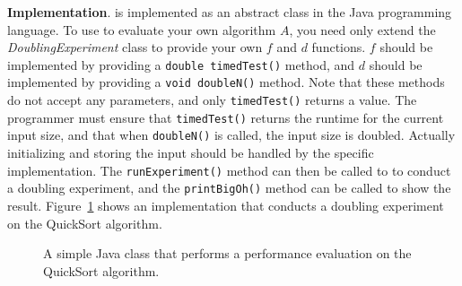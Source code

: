     {\bf Implementation}.
    \toolname is implemented as an abstract class in the Java
    programming language.  To use \toolname to evaluate your own
    algorithm $A$, you need only extend the \textit{DoublingExperiment}
    class to provide your own $f$ and $d$ functions.  $f$ should be
    implemented by providing a \texttt{double timedTest()} method,
    and $d$ should be implemented by providing a \texttt{void doubleN()}
    method. Note that these methods do not accept any parameters,
    and only \texttt{timedTest()} returns a value. The programmer
    must ensure that \texttt{timedTest()} returns the runtime for the
    current input size, and that when \texttt{doubleN()} is called,
    the input size is doubled.  Actually initializing and storing the
    input should be handled by the specific implementation. The
    \texttt{runExperiment()} method can then be called to to conduct
    a doubling experiment, and the \texttt{printBigOh()} method can
    be called to show the result. Figure~\ref{fig:qsprogram} shows an
    implementation that conducts a doubling experiment on the QuickSort
    algorithm.


    
    \begin{figure}[t]
    
    \vspace{-0.15in}
    \caption{A simple Java class that performs a performance evaluation
    on the QuickSort algorithm.}\vspace{-0.20in}
    \label{fig:qsprogram}
    \end{figure}
